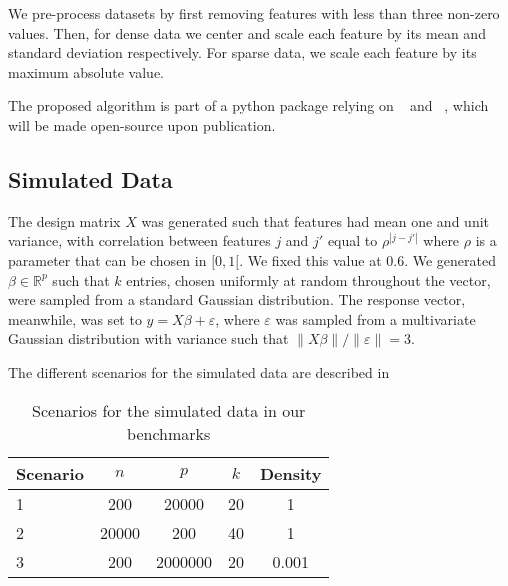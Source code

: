 We pre-process datasets by first removing features with less than three non-zero values. Then, for dense data we center and scale each feature by its mean and standard deviation respectively.
For sparse data, we scale each feature by its maximum absolute value.

The proposed algorithm is part of a python package relying on ~\parencite{harris2020} and ~\parencite{lam2015}, which will
be made open-source upon publication. 


\subsection{Simulated Data}
\label{sec:experiments-real-data}

The design matrix $X$ was generated such that features had mean one and unit variance, with correlation between features $j$ and $j'$ equal to $\rho^{|j-j'|}$ where $\rho$ is a parameter that can be chosen in $[0, 1[$.
We fixed this value at $0.6$.
We generated \(\beta \in \mathbb{R}^p\) such that \(k\) entries, chosen uniformly at random throughout the vector, were sampled from a standard Gaussian distribution.
The response vector, meanwhile, was set to $y=X\beta + \varepsilon$, where
$\varepsilon$ was sampled from a multivariate Gaussian distribution with variance such that $\lVert X\beta\rVert / \lVert \varepsilon \rVert = 3$.

The different scenarios for the simulated data are described in 

\begin{table}[hbt]
  \centering
  \caption{Scenarios for the simulated data in our benchmarks}
  \label{tab:simulated-data}
  \begin{tabular}{
      l
      S[table-format=5.0,round-mode=off]
      S[table-format=7.0,round-mode=off]
      S[table-format=2.0,round-mode=off]
      S[table-format=1.3,round-mode=off]
    }
    \toprule
    {Scenario} & \(n\) & \(p\)   & \(k\) & {Density} \\           & 200   & 20000   & 20    & 1         \\
    2          & 20000 & 200     & 40    & 1         \\
    3          & 200   & 2000000 & 20    & 0.001     \\ \bottomrule
  \end{tabular}
\end{table}

